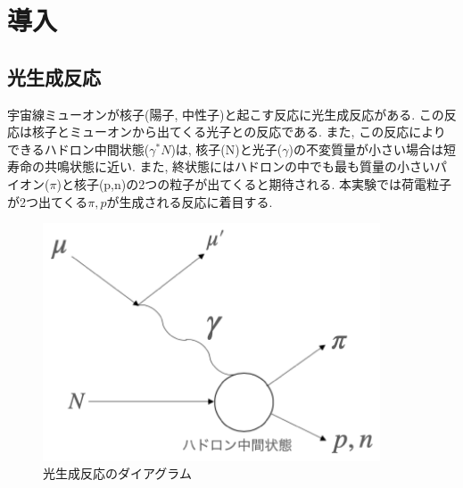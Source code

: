 \chapter{導入} \label{cha:introduction}

\section{光生成反応}

宇宙線ミューオンが核子(陽子, 中性子)と起こす反応に光生成反応がある.
この反応は核子とミューオンから出てくる光子との反応である.
また, この反応によりできるハドロン中間状態($\gamma ^* N$)は, 核子(N)と光子($\gamma$)の不変質量が小さい場合は短寿命の共鳴状態に近い.
また, 終状態にはハドロンの中でも最も質量の小さいパイオン($\pi$)と核子(p,n)の2つの粒子が出てくると期待される.
本実験では荷電粒子が2つ出てくる$\pi,p$が生成される反応に着目する.

\begin{figure}[H]
	\centering
	\includegraphics[width=10cm]{img/diagram_photoproduction.png}
	\caption{光生成反応のダイアグラム}
\end{figure}